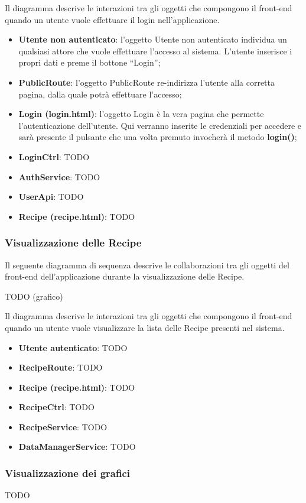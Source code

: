 	Il diagramma descrive le interazioni tra gli oggetti che compongono il front-end quando un utente vuole effettuare il login nell'applicazione.
	\begin{itemize}
		\item \textbf{Utente non autenticato}: l'oggetto Utente non autenticato individua un qualsiasi attore che vuole effettuare l'accesso al sistema. L'utente inserisce i propri dati e preme il bottone ``Login'';
		\item \textbf{PublicRoute}: l'oggetto PublicRoute re-indirizza l'utente alla corretta pagina, dalla quale potrà effettuare l'accesso;
		\item \textbf{Login (login.html)}: l'oggetto Login è la vera pagina che permette l'autenticazione dell'utente. Qui verranno inserite le credenziali per accedere e sarà presente il pulsante che una volta premuto invocherà il metodo \textbf{login()};
		\item \textbf{LoginCtrl}: TODO
		\item \textbf{AuthService}: TODO
		\item \textbf{UserApi}: TODO
		\item \textbf{Recipe (recipe.html)}: TODO
	\end{itemize}

	\subsubsection{Visualizzazione delle Recipe} %
	\label{ssub:visualizzazione_delle_recipe}
	Il seguente diagramma di sequenza descrive le collaborazioni tra gli oggetti del front-end dell'applicazione durante la visualizzazione delle Recipe. \newline

	TODO (grafico) \newline
	\noindent

	Il diagramma descrive le interazioni tra gli oggetti che compongono il front-end quando un utente vuole visualizzare la lista delle Recipe presenti nel sistema.
	\begin{itemize}
		\item \textbf{Utente autenticato}: TODO
		\item \textbf{RecipeRoute}: TODO
		\item \textbf{Recipe (recipe.html)}: TODO
		\item \textbf{RecipeCtrl}: TODO
		\item \textbf{RecipeService}: TODO
		\item \textbf{DataManagerService}: TODO
	\end{itemize}

	\subsubsection{Visualizzazione dei grafici} %
	\label{sub:visualizzazione_dei_grafici}
	TODO

